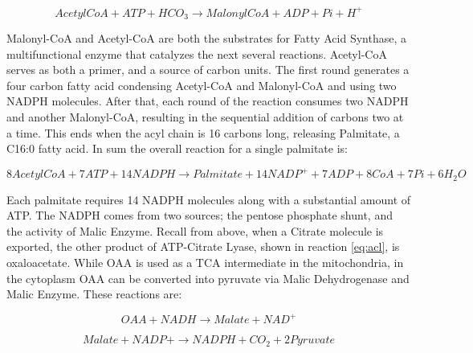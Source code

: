 \documentclass{tufte-handout}
\begin{document}
\begin{equation}\label{eq:acc}
AcetylCoA + ATP + HCO_3 \rightarrow MalonylCoA + ADP + Pi + H^+
\end{equation}

Malonyl-CoA and Acetyl-CoA are both the substrates for Fatty Acid Synthase, a multifunctional enzyme that catalyzes the next several reactions.  Acetyl-CoA serves as both a primer, and a source of carbon units.  The first round generates a four carbon fatty acid condensing Acetyl-CoA and Malonyl-CoA and using two NADPH molecules.  After that, each round of the reaction consumes two NADPH and another Malonyl-CoA, resulting in the sequential addition of carbons two at a time.  This ends when the acyl chain is 16 carbons long, releasing Palmitate, a C16:0 fatty acid.  In sum the overall reaction for a single palmitate is:

\begin{equation}\label{eq:pamitate-overall}
8 AcetylCoA + 7 ATP + 14 NADPH \rightarrow Palmitate + 14 NADP^+ + 7 ADP + 8 CoA  + 7 Pi + 6H_2O
\end{equation}

  Each palmitate requires 14 NADPH molecules along with a substantial amount of ATP.  The NADPH comes from two sources; the pentose phosphate shunt, and the activity of Malic Enzyme.  Recall from above, when a Citrate molecule is exported, the other product of ATP-Citrate Lyase, shown in reaction \ref{eq:acl}, is oxaloacetate.  While OAA is used as a TCA intermediate in the mitochondria, in the cytoplasm OAA can be converted into pyruvate via Malic Dehydrogenase and Malic Enzyme.  These reactions are:

\begin{equation}\label{eq:me}
OAA + NADH  \rightarrow Malate + NAD^+
\end{equation}

\begin{equation}\label{eq:mdh}
Malate + NADP+  \rightarrow NADPH + CO_2 + 2 Pyruvate
\end{equation}
\end{document}
